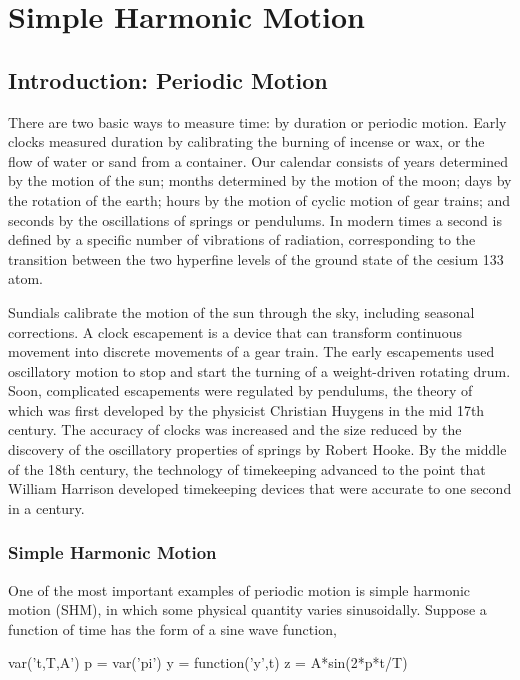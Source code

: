 \chapter{Simple Harmonic Motion}

\section{Introduction: Periodic Motion}

There are two basic ways to measure time: by duration or periodic motion. Early clocks measured duration by calibrating the burning of incense or wax, or the flow of water or sand from a container. Our calendar consists of years determined by the motion of the sun; months determined by the motion of the moon; days by the rotation of the earth; hours by the motion of cyclic motion of gear trains; and seconds by the oscillations of springs or pendulums. In modern times a second is defined by a specific number of vibrations of radiation, corresponding to the transition between the two hyperfine levels of the ground state of the cesium 133 atom.


Sundials calibrate the motion of the sun through the sky, including seasonal
corrections. A clock escapement is a device that can transform continuous movement into discrete movements of a gear train. The early escapements used oscillatory motion to stop and start the turning of a weight-driven rotating drum. Soon, complicated escapements were regulated by pendulums, the theory of which was first developed by the physicist Christian Huygens in the mid 17th century. The accuracy of clocks was increased and the size reduced by the discovery of the oscillatory properties of springs by Robert Hooke. By the middle of the 18th century, the technology of timekeeping advanced to the point that William Harrison developed timekeeping devices that were accurate to one second in a century. 

\subsection{Simple Harmonic Motion}
One of the most important examples of periodic motion is simple harmonic motion (SHM), in which some physical quantity varies sinusoidally. Suppose a function of time has the form of a sine wave function,

\begin{sagesilent}
var('t,T,A')
p = var('pi')
y = function('y',t)
z = A*sin(2*p*t/T)
\end{sagesilent}

